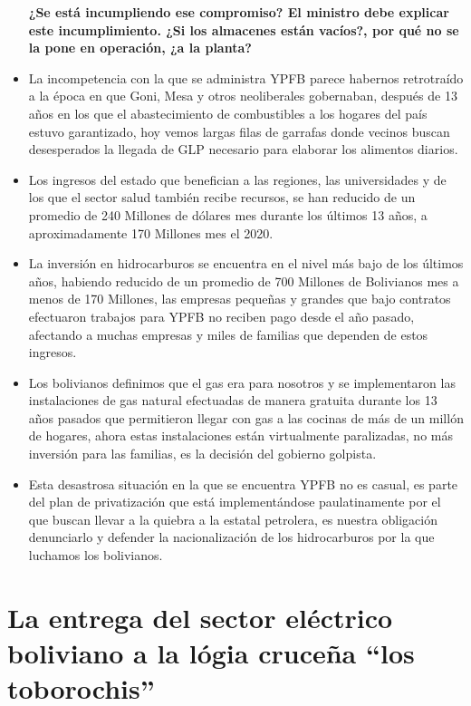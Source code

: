 \documentclass[a4paper, nobind]{templates/ociamthesis}
\begin{document}
\begin{itemize}
  \textbf{¿Se está incumpliendo ese compromiso? El ministro debe explicar este incumplimiento. ¿Si los almacenes están vacíos?, por qué no se la pone en operación, ¿a la planta?}
\item
  La incompetencia con la que se administra YPFB parece habernos retrotraído a la época en que Goni, Mesa y otros neoliberales gobernaban, después de 13 años en los que el abastecimiento de combustibles a los hogares del país estuvo garantizado, hoy vemos largas filas de garrafas donde vecinos buscan desesperados la llegada de GLP necesario para elaborar los alimentos diarios.
\item
  Los ingresos del estado que benefician a las regiones, las universidades y de los que el sector salud también recibe recursos, se han reducido de un promedio de 240 Millones de dólares mes durante los últimos 13 años, a aproximadamente 170 Millones mes el 2020.
\item
  La inversión en hidrocarburos se encuentra en el nivel más bajo de los últimos años, habiendo reducido de un promedio de 700 Millones de Bolivianos mes a menos de 170 Millones, las empresas pequeñas y grandes que bajo contratos efectuaron trabajos para YPFB no reciben pago desde el año pasado, afectando a muchas empresas y miles de familias que dependen de estos ingresos.
\item
  Los bolivianos definimos que el gas era para nosotros y se implementaron las instalaciones de gas natural efectuadas de manera gratuita durante los 13 años pasados que permitieron llegar con gas a las cocinas de más de un millón de hogares, ahora estas instalaciones están virtualmente paralizadas, no más inversión para las familias, es la decisión del gobierno golpista.
\item
  Esta desastrosa situación en la que se encuentra YPFB no es casual, es parte del plan de privatización que está implementándose paulatinamente por el que buscan llevar a la quiebra a la estatal petrolera, es nuestra obligación denunciarlo y defender la nacionalización de los hidrocarburos por la que luchamos los bolivianos.
\end{itemize}

\hypertarget{la-entrega-del-sector-eluxe9ctrico-boliviano-a-la-luxf3gia-cruceuxf1a-los-toborochis}{%
\chapter{La entrega del sector eléctrico boliviano a la lógia cruceña ``los toborochis''}\label{la-entrega-del-sector-eluxe9ctrico-boliviano-a-la-luxf3gia-cruceuxf1a-los-toborochis}}
\end{document}
